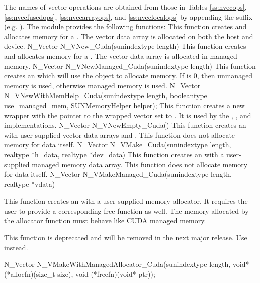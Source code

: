 The names of vector operations are obtained from those in Tables \ref{ss:nvecops},
\ref{ss:nvecfusedops}, \ref{ss:nvecarrayops}, and \ref{ss:nveclocalops}
by appending the suffix 
(e.g. ). The module {\nveccuda} provides the following
functions:
{
  This function creates and allocates memory for a {\cuda} .
  The vector data array is allocated on both the host and device.
}
{
  N\_Vector N\_VNew\_Cuda(sunindextype length)
}
{
  This function creates and allocates memory for a {\cuda} .
  The vector data array is allocated in managed memory.
}
{
  N\_Vector N\_VNewManaged\_Cuda(sunindextype length)
}
{
  This function creates an {\nveccuda} which will use the 
  object to allocate memory. If  is 0, then unmanaged
  memory is used, otherwise managed memory is used.
}
{
  N\_Vector N\_VNewWithMemHelp\_Cuda(sunindextype length,
                                     booleantype use\_managed\_mem,
                                     SUNMemoryHelper helper);
}
{
  This function creates a new {\nvector} wrapper with the pointer to
  the wrapped {\cuda} vector set to . It is used by the
  , , and 
  implementations.
}
{
  N\_Vector N\_VNewEmpty\_Cuda()
}
{
  This function creates an {\nveccuda} with user-supplied vector data arrays
   and . This function does not allocate memory for
  data itself.
}
{
  N\_Vector N\_VMake\_Cuda(sunindextype length, realtype *h\_data, realtype *dev\_data)
}
{
  This function creates an {\nveccuda} with a user-supplied managed memory data
  array. This function does not allocate memory for data itself.
}
{
  N\_Vector N\_VMakeManaged\_Cuda(sunindextype length, realtype *vdata)
}
{
  This function creates an {\nveccuda} with a user-supplied memory allocator.
  It requires the user to provide a corresponding free function as well.
  The memory allocated by the allocator function must behave like CUDA managed memory.

  \warn This function is deprecated and will be removed in the next major release.
  Use  instead.
}
{
  N\_Vector N\_VMakeWithManagedAllocator\_Cuda(sunindextype length,
                                               void* (*allocfn)(size\_t size),
                                               void (*freefn)(void* ptr));
}

